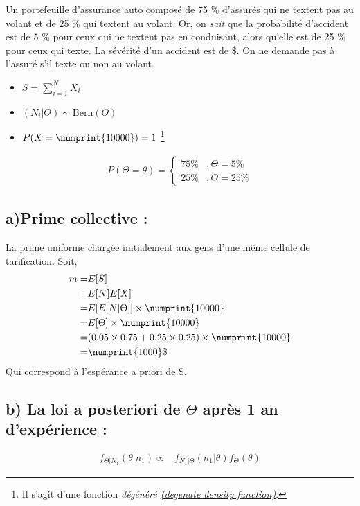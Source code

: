 Un portefeuille d'assurance auto composé de 75 \% d'assurés qui ne textent pas au volant et de 25 \% qui textent au volant. Or, on \textit{sait} que la probabilité d'accident est de 5 \% pour ceux qui ne textent pas en conduisant, alors qu'elle est de 25 \% pour ceux qui texte. La sévérité d'un accident est de  \$. On ne demande pas à l'assuré s'il texte ou non au volant. 
\begin{itemize}
\item $S = \sum_{i = 1}^{N}X_i$
\item $(N_i|\Theta) \sim \text{Bern}(\Theta)$
\item $P(X = \numprint{10000}) = 1$ \footnote{Il s'agit d'une fonction \emph{dégénéré  \href{https://en.wikipedia.org/wiki/Degenerate_distribution}{(degenate density function)}}.}
\end{itemize}
\begin{align*}
	P(\Theta = \theta) =
     \left\{
     \begin{array}{rl}
      75\% &, \Theta = 5\% \\
      25\% &, \Theta = 25\%
     \end{array}
     \right.
\end{align*}

\subsection*{a)Prime collective :}
La prime uniforme chargée initialement aux gens d'une même cellule de tarification. Soit,
\begin{align*}
m =& E[S] \\
=& E[N] E[X] \\
=& E[E[N|\Theta]] \times  \numprint{10000} \\
=& E[\Theta] \times  \numprint{10000}\\
=& (0.05\times 0.75 + 0.25\times 0.25) \times  \numprint{10000}\\
=& \numprint{1000} \$
\end{align*}
Qui correspond à l'espérance a priori de S.

\subsection*{b) La loi a posteriori de $\Theta$ après 1 an d'expérience :}
\begin{align*}
f_{\Theta|N_1}(\theta|n_1) \propto & f_{N_1|\Theta}(n_1|\theta) f_{\Theta}(\theta)
\end{align*}
